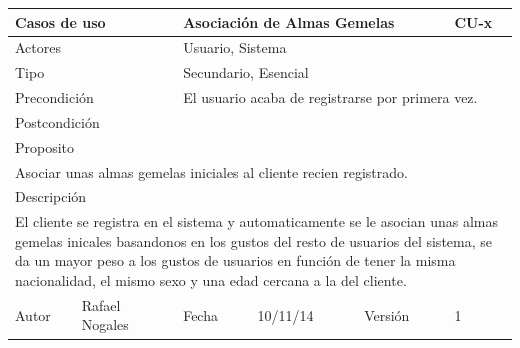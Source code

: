 \documentclass{article}
\begin{document}
\begin{table}[h]
\begin{tabular}{|l|l|l|l|l|l|}
\hline
\multicolumn{2}{|p{2cm}|}{Casos de uso}  & \multicolumn{3}{p{7cm}|}{\textbf{Asociación de Almas Gemelas}} & CU-x \\
\hline
\multicolumn{2}{|p{2cm}|}{Actores}       & \multicolumn{4}{p{8cm}|}{Usuario, Sistema}        \\
\hline
\multicolumn{2}{|p{2cm}|}{Tipo}          & \multicolumn{4}{p{8cm}|}{Secundario, Esencial}        \\
\hline
\multicolumn{2}{|p{2cm}|}{Precondición}  & \multicolumn{4}{p{8cm}|}{El usuario acaba de registrarse por primera vez.}        \\
\hline
\multicolumn{2}{|p{2cm}|}{Postcondición} & \multicolumn{4}{p{8cm}|}{}        \\
\hline
\multicolumn{6}{|p{10cm}|}{Proposito}                                   \\
\hline
\multicolumn{6}{|p{10cm}|}{Asociar unas almas gemelas iniciales al cliente recien registrado.}                                            \\
\hline
\multicolumn{6}{|p{10cm}|}{Descripción}                                 \\
\hline
\multicolumn{6}{|p{10cm}|}{El cliente se registra en el sistema y automaticamente se le asocian unas 
almas gemelas inicales basandonos en los gustos del resto de usuarios del sistema, se da un mayor peso a los gustos de usuarios en función de tener la misma nacionalidad, el mismo sexo y una edad cercana a la del cliente.}                                        \\
\hline
Autor              &     Rafael Nogales         & Fecha    &  10/11/14   &   Versión  & 1\\     
\hline
\end{tabular}
\end{table}
\end{document}
